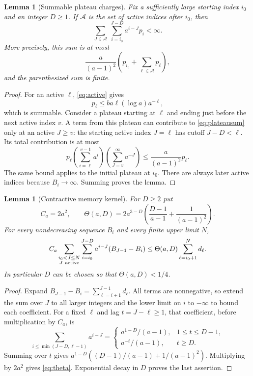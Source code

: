 \documentclass[11pt]{article}
\newtheorem{lemma}[theorem]{Lemma}
\theoremstyle{remark}\newtheorem{remark}[theorem]{Remark}
\begin{document}
\begin{lemma}[Summable plateau charges]\label{lem:plateau}
Fix a sufficiently large starting index $i_0$ and an integer $D\ge1$.
If $\mathcal A$ is the set of active indices after $i_0$, then
\begin{equation}\label{eq:plateausum}
 \sum_{J\in\mathcal A}\ \sum_{i=i_0}^{J-D} a^{i-J}p_i<\infty.
\end{equation}
More precisely, this sum is at most
\[
 \frac{a}{(a-1)^2}
 \left(p_{i_0}+\sum_{\ell\in\mathcal A}p_\ell\right),
\]
and the parenthesized sum is finite.
\end{lemma}

\begin{proof}
For an active $\ell$, \eqref{eq:active} gives
\[
 p_\ell\le ba\ell(\log a)a^{-\ell},
\]
which is summable. Consider a plateau starting at $\ell$ and ending just
before the next active index $v$. A term from this plateau can contribute
to \eqref{eq:plateausum} only at an active $J\ge v$: the starting active
index $J=\ell$ has cutoff $J-D<\ell$. Its total contribution is at most
\[
 p_\ell
 \left(\sum_{i=\ell}^{v-1}a^i\right)
 \left(\sum_{J=v}^{\infty}a^{-J}\right)
 \le \frac{a}{(a-1)^2}p_\ell.
\]
The same bound applies to the initial plateau at $i_0$. There are always
later active indices because $B_i\to\infty$. Summing proves the lemma.
\end{proof}

\begin{lemma}[Contractive memory kernel]\label{lem:kernel}
For $D\ge2$ put
\begin{equation}\label{eq:theta}
 C_a=2a^2,\qquad
 \Theta(a,D)=2a^{3-D}
 \left(\frac{D-1}{a-1}+\frac{1}{(a-1)^2}\right).
\end{equation}
For every nondecreasing sequence $B_i$ and every finite upper limit $N$,
\begin{equation}\label{eq:kernelsum}
 C_a\sum_{\substack{i_0<J\le N\\J\ {\rm active}}}
       \sum_{i=i_0}^{J-D}a^{i-J}(B_{J-1}-B_i)
 \le\Theta(a,D)\sum_{\ell=i_0+1}^{N}d_\ell.
\end{equation}
In particular $D$ can be chosen so that $\Theta(a,D)<1/4$.
\end{lemma}

\begin{proof}
Expand $B_{J-1}-B_i=\sum_{\ell=i+1}^{J-1}d_\ell$. All terms are
nonnegative, so extend the sum over $J$ to all larger integers and the
lower limit on $i$ to $-\infty$ to bound each coefficient. For a fixed
$\ell$ and lag $t=J-\ell\ge1$, that coefficient, before multiplication by
$C_a$, is
\[
 \sum_{i\le\min(J-D,\ell-1)}a^{i-J}
 =\begin{cases}
  a^{1-D}/(a-1),&1\le t\le D-1,\\
  a^{-t}/(a-1),&t\ge D.
 \end{cases}
\]
Summing over $t$ gives
$a^{1-D}((D-1)/(a-1)+1/(a-1)^2)$. Multiplying by $2a^2$ gives
\eqref{eq:theta}. Exponential decay in $D$ proves the last assertion.
\end{proof}
\end{document}
